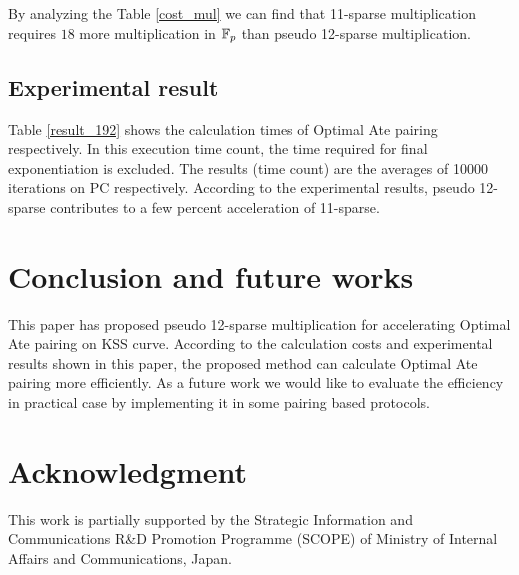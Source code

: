 By analyzing the Table \ref{cost_mul} we can find that  11-sparse multiplication requires $18$ more multiplication in ${\mathbb{F}}_{p}$ than pseudo 12-sparse multiplication.
\subsection{Experimental result}
Table \ref{result_192} shows the calculation times of Optimal Ate pairing respectively. In this execution time count, the time required for final exponentiation is excluded. The results (time count) are the averages of 10000 iterations on PC respectively. According to the experimental results, pseudo 12-sparse contributes to a few percent acceleration of 11-sparse.
\renewcommand{\baselinestretch}{1.5}
\begin{table}[htb]
	\begin{center}
		\caption{Calculation time of Optimal Ate pairing at the 192-bit security level}
		\label{result_192}
	\end{center}
\end{table}
\renewcommand{\baselinestretch}{1.0}

\section{Conclusion and future works}
This paper has proposed pseudo 12-sparse multiplication for accelerating Optimal Ate pairing on KSS curve. According to the calculation costs and experimental results shown in this paper, the proposed method can calculate Optimal Ate pairing more efficiently. As a future work we would like to evaluate the efficiency in practical case by implementing it in some pairing based protocols. 

\section*{Acknowledgment}
This work is partially supported by the Strategic Information and Communications R\&D Promotion Programme (SCOPE) of Ministry of Internal Affairs and Communications, Japan. 

